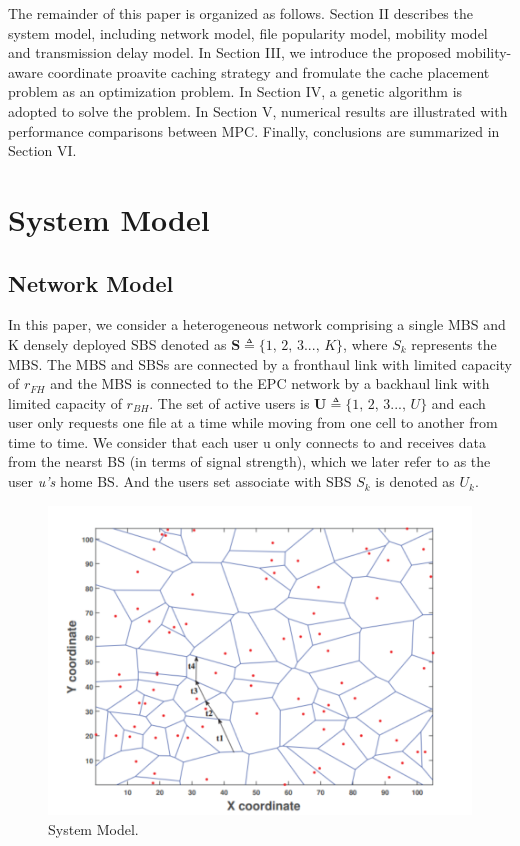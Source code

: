 \documentclass[conference]{IEEEtran}
\begin{document}
 The remainder of this paper is organized as follows. Section II describes the system model, including network model, file popularity model, mobility model and transmission delay model. In Section III, we introduce the proposed mobility-aware coordinate proavite caching strategy and fromulate the cache placement problem as an optimization problem. In Section IV, a genetic algorithm is adopted to solve the problem. In Section V, numerical results are illustrated with performance comparisons between MPC. Finally, conclusions are summarized in Section VI.
\section{System Model}
\subsection{Network Model}
In this paper, we\cite{8116421} consider a heterogeneous network comprising a single MBS and K densely deployed SBS denoted as
$\mathbf{S} \triangleq\{1\mathrm{,\,}2\mathrm{,\,}3...\mathrm{,\,}K\}$, where $S_k$ represents the MBS. The MBS and SBSs are connected by a fronthaul link with limited capacity of $ r_{FH}$ and the MBS is connected to the EPC network by a backhaul link with limited capacity of $ r_{BH}$. The set of active users is $\mathbf{U} \triangleq\{1\mathrm{,\,}2\mathrm{,\,}3...\mathrm{,\,}U\}$ and each user only requests one file at a time while moving from one cell to another from time to time. We consider that each user u only connects to and receives data from the nearst BS (in terms of signal strength), which we later refer to as the user \emph{u’s} home BS. And the users set associate with SBS $S_k$ is denoted as $U_k$.
\begin{figure}[htbp]
 \centerline{\includegraphics[scale=0.7]{fig1.png}}
 \caption{System Model.}
 \label{fig 1}
\end{figure}
\end{document}
